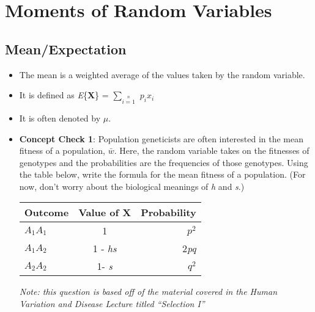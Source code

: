 \documentclass[12pt]{report}
\begin{document}
\section{Moments of Random Variables}

\subsection{Mean/Expectation}

\begin{itemize}

\item The mean is a weighted average of the values taken by the random variable.

\item It is defined as \textit{E}\{\textbf{X}\} =  $\sum\limits_{i = 1}\limits^{n}$ \textit{$p_{i}$}\textit{$x_{i}$} 

\item It is often denoted by $\mu$.

\item \textbf{Concept Check 1}: Population geneticists are often interested in the mean fitness of a population, $\bar{w}$. Here, the random variable takes on the fitnesses of genotypes and the probabilities are the frequencies of those genotypes. Using the table below, write the formula for the mean fitness of a population. (For now, don't worry about the biological meanings of \textit{h} and \textit{s}.) 

\bigskip
\begin{tabular}{| l | c | r |}
	\hline
 Outcome & Value of \textbf{X} & Probability \\ \hline
  \textit{$A_{1}$$A_{1}$} & 1 & \textit{$p^{2}$} \\
  \textit{$A_{1}$$A_{2}$} & 1 - \textit{hs} & 2\textit{pq} \\
  \textit{$A_{2}$$A_{2}$} & 1- \textit{s} & \textit{$q^{2}$} \\ \hline
\end{tabular}

\bigskip

\bigskip

\bigskip

\bigskip

\bigskip

\bigskip

\bigskip

\bigskip

\textit{Note: this question is based off of the material covered in the Human Variation and Disease Lecture titled ``Selection I''}


\end{itemize}
\end{document}
